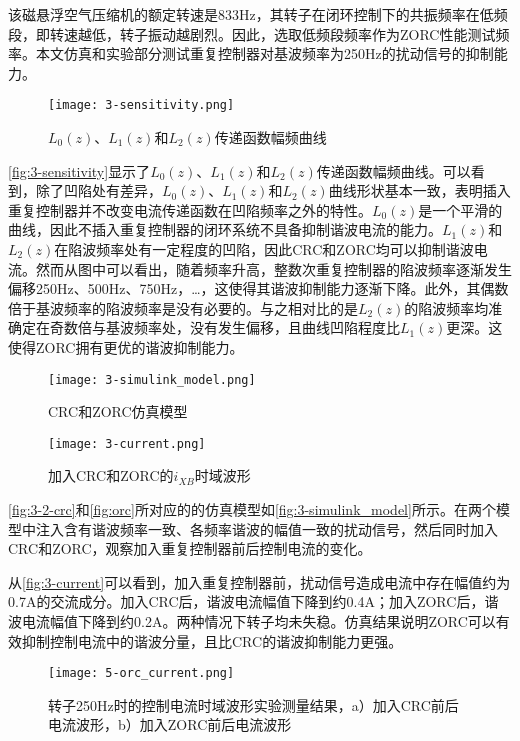 \documentclass[
  lang=cn,
  degree=master,
  openany,oneside
]{nuaathesis}
\begin{document}
该磁悬浮空气压缩机的额定转速是833Hz，其转子在闭环控制下的共振频率在低频段，即转速越低，转子振动越剧烈。因此，选取低频段频率作为ZORC性能测试频率。本文仿真和实验部分测试重复控制器对基波频率为250Hz的扰动信号的抑制能力。
\begin{figure}[h!]
	\texttt{[image: 3-sensitivity.png]}
	\caption{$L_0(z)$、$L_1(z)$和$L_2(z)$传递函数幅频曲线}
	\label{fig:3-sensitivity}
\end{figure}

\autoref{fig:3-sensitivity}显示了$L_0(z)$、$L_1(z)$和$L_2(z)$传递函数幅频曲线。可以看到，除了凹陷处有差异，$L_0(z)$、$L_1(z)$和$L_2(z)$曲线形状基本一致，表明插入重复控制器并不改变电流传递函数在凹陷频率之外的特性。$L_0(z)$是一个平滑的曲线，因此不插入重复控制器的闭环系统不具备抑制谐波电流的能力。$L_1(z)$和$L_2(z)$在陷波频率处有一定程度的凹陷，因此CRC和ZORC均可以抑制谐波电流。然而从图中可以看出，随着频率升高，整数次重复控制器的陷波频率逐渐发生偏移250Hz、500Hz、750Hz，…，这使得其谐波抑制能力逐渐下降。此外，其偶数倍于基波频率的陷波频率是没有必要的。与之相对比的是$L_2(z)$的陷波频率均准确定在奇数倍与基波频率处，没有发生偏移，且曲线凹陷程度比$L_1(z)$更深。这使得ZORC拥有更优的谐波抑制能力。

\begin{figure}[h!]
	\texttt{[image: 3-simulink\_model.png]}
	\caption{CRC和ZORC仿真模型}
	\label{fig:3-simulink_model}
\end{figure}

\begin{figure}[h!]
	\texttt{[image: 3-current.png]}
	\caption{加入CRC和ZORC的$i_{XB}$时域波形}
	\label{fig:3-current}
\end{figure}

\autoref{fig:3-2-crc}和\autoref{fig:orc}所对应的的仿真模型如\autoref{fig:3-simulink_model}所示。在两个模型中注入含有谐波频率一致、各频率谐波的幅值一致的扰动信号，然后同时加入CRC和ZORC，观察加入重复控制器前后控制电流的变化。

从\autoref{fig:3-current}可以看到，加入重复控制器前，扰动信号造成电流中存在幅值约为0.7A的交流成分。加入CRC后，谐波电流幅值下降到约0.4A；加入ZORC后，谐波电流幅值下降到约0.2A。两种情况下转子均未失稳。仿真结果说明ZORC可以有效抑制控制电流中的谐波分量，且比CRC的谐波抑制能力更强。

\begin{figure}[h!]
	\texttt{[image: 5-orc\_current.png]}
	\caption{转子250Hz时的控制电流时域波形实验测量结果，a）加入CRC前后电流波形，b）加入ZORC前后电流波形}
	\label{fig:5-orc_current}
\end{figure}
\end{document}
